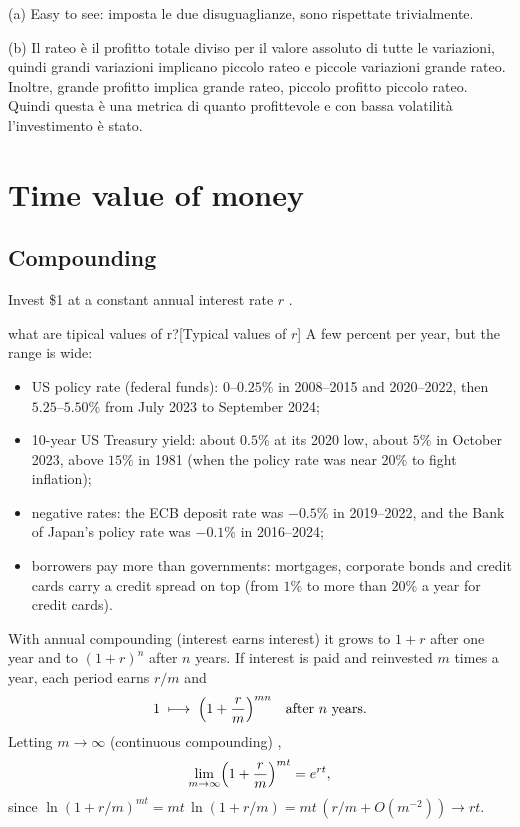 \begin{paracol}{2}
\begin{mysolution}
(a) Easy to see: imposta le due disuguaglianze, sono rispettate trivialmente.

(b) Il rateo è il profitto totale diviso per il valore assoluto di tutte le variazioni, quindi grandi
variazioni implicano piccolo rateo e piccole variazioni grande rateo. Inoltre, grande profitto implica
grande rateo, piccolo profitto piccolo rateo. Quindi questa è una metrica di quanto profittevole e con
bassa volatilità l'investimento è stato.
\end{mysolution}

\section{Time value of money}\label{sec:tvm}

\subsection{Compounding}
Invest \$1 at a constant annual interest rate $r$ . \begin{answer}{what are tipical values of r?}[Typical values of $r$]
A few percent per year, but the range is wide:
\begin{itemize}
  \item US policy rate (federal funds): $0$--$0.25\%$ in 2008--2015 and 2020--2022, then
        $5.25$--$5.50\%$ from July 2023 to September 2024;
  \item 10-year US Treasury yield: about $0.5\%$ at its 2020 low, about $5\%$ in October 2023,
        above $15\%$ in 1981 (when the policy rate was near $20\%$ to fight inflation);
  \item negative rates: the ECB deposit rate was $-0.5\%$ in 2019--2022, and the Bank of Japan's
        policy rate was $-0.1\%$ in 2016--2024;
  \item borrowers pay more than governments: mortgages, corporate bonds and credit cards carry a
        credit spread on top (from $1\%$ to more than $20\%$ a year for credit cards).
\end{itemize}
\end{answer} With annual compounding
(interest earns interest) it grows to $1+r$ after one year and to $(1+r)^n$ after $n$ years. If
interest is paid and reinvested $m$ times a year, each period earns $r/m$ and
\begin{equation}\label{eq:mcompound}
  1 \;\longmapsto\; \Bigl(1+\frac{r}{m}\Bigr)^{mn} \quad\text{after $n$ years.}
\end{equation}
Letting $m\to\infty$ (continuous compounding) ,
\begin{equation}\label{eq:contcompound}
  \lim_{m\to\infty}\Bigl(1+\frac{r}{m}\Bigr)^{mt} = e^{rt},
\end{equation}
since $\ln(1+r/m)^{mt} = mt\,\ln(1+r/m) = mt\,(r/m + O(m^{-2})) \to rt$.


\end{paracol}
